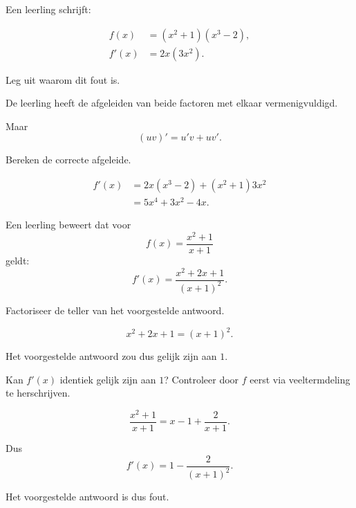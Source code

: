 \documentclass{ximera}
\begin{document}
\begin{oefening}{\oefU\ESS}

Een leerling schrijft:

\[
\begin{aligned}
f(x)&=(x^2+1)(x^3-2),\\
f'(x)&=2x(3x^2).
\end{aligned}
\]

\begin{question}
Leg uit waarom dit fout is.

\begin{oplossing}
De leerling heeft de afgeleiden van beide factoren met elkaar
vermenigvuldigd.

Maar
\[
(uv)'=u'v+uv'.
\]
\end{oplossing}
\end{question}


\begin{question}
Bereken de correcte afgeleide.

\begin{oplossing}
\[
\begin{aligned}
f'(x)
&=2x(x^3-2)+(x^2+1)3x^2\\
&=5x^4+3x^2-4x.
\end{aligned}
\]
\end{oplossing}
\end{question}

\end{oefening}



\begin{oefening}{\oefU}

Een leerling beweert dat voor
\[
f(x)=\frac{x^2+1}{x+1}
\]
geldt:
\[
f'(x)=\frac{x^2+2x+1}{(x+1)^2}.
\]

\begin{question}
Factoriseer de teller van het voorgestelde antwoord.

\begin{oplossing}
\[
x^2+2x+1=(x+1)^2.
\]

Het voorgestelde antwoord zou dus gelijk zijn aan $1$.
\end{oplossing}
\end{question}


\begin{question}
Kan $f'(x)$ identiek gelijk zijn aan $1$?
Controleer door $f$ eerst via veeltermdeling te herschrijven.

\begin{oplossing}
\[
\frac{x^2+1}{x+1}
=
x-1+\frac{2}{x+1}.
\]

Dus
\[
f'(x)
=
1-\frac{2}{(x+1)^2}.
\]

Het voorgestelde antwoord is dus fout.
\end{oplossing}
\end{question}

\end{oefening}
\end{document}
